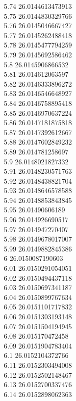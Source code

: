{5.74	26.0144613473913\\
5.75	26.0144830329766\\
5.76	26.0145046667427\\
5.77	26.0145262488418\\
5.78	26.0145477794259\\
5.79	26.0145692586462\\
5.8	26.0145906866532\\
5.81	26.014612063597\\
5.82	26.0146333896272\\
5.83	26.0146546648927\\
5.84	26.0146758895418\\
5.85	26.0146970637224\\
5.86	26.0147181875818\\
5.87	26.0147392612667\\
5.88	26.0147602849232\\
5.89	26.014781258697\\
5.9	26.0148021827332\\
5.91	26.0148230571763\\
5.92	26.0148438821704\\
5.93	26.0148646578588\\
5.94	26.0148853843845\\
5.95	26.01490606189\\
5.96	26.014926690517\\
5.97	26.014947270407\\
5.98	26.0149678017007\\
5.99	26.0149882845386\\
6	26.0150087190603\\
6.01	26.0150291054051\\
6.02	26.0150494437118\\
6.03	26.0150697341187\\
6.04	26.0150899767634\\
6.05	26.0151101717832\\
6.06	26.0151303193148\\
6.07	26.0151504194945\\
6.08	26.015170472458\\
6.09	26.0151904783404\\
6.1	26.0152104372766\\
6.11	26.0152303494008\\
6.12	26.0152502148467\\
6.13	26.0152700337476\\
6.14	26.0152898062363\\
}

